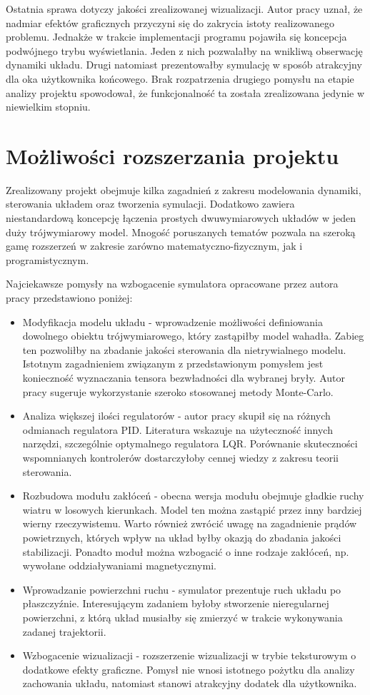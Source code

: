 \documentclass[12pt, twoside, openany]{report}
\theoremstyle{definition}
\begin{document}
Ostatnia sprawa dotyczy jakości zrealizowanej wizualizacji. Autor pracy uznał, że nadmiar efektów graficznych przyczyni się do zakrycia istoty realizowanego problemu. Jednakże w trakcie implementacji programu pojawiła się koncepcja podwójnego trybu wyświetlania. Jeden z nich pozwalałby na wnikliwą obserwację dynamiki układu. Drugi natomiast prezentowałby symulację w sposób atrakcyjny dla oka użytkownika końcowego. Brak rozpatrzenia drugiego pomysłu na etapie analizy projektu spowodował, że funkcjonalność ta została zrealizowana jedynie w niewielkim stopniu.

\section{Możliwości rozszerzania projektu}
Zrealizowany projekt obejmuje kilka zagadnień z zakresu modelowania dynamiki, sterowania układem oraz tworzenia symulacji. Dodatkowo zawiera niestandardową koncepcję łączenia prostych dwuwymiarowych układów w jeden duży trójwymiarowy model. Mnogość poruszanych tematów pozwala na szeroką gamę rozszerzeń w zakresie zarówno matematyczno-fizycznym, jak i programistycznym.

Najciekawsze pomysły na wzbogacenie symulatora opracowane przez autora pracy przedstawiono poniżej:
\begin{itemize}
\item Modyfikacja modelu układu - wprowadzenie możliwości definiowania dowolnego obiektu trójwymiarowego, który zastąpiłby model wahadła. Zabieg ten pozwoliłby na zbadanie jakości sterowania dla nietrywialnego modelu. Istotnym zagadnieniem związanym z przedstawionym pomysłem jest konieczność wyznaczania tensora bezwładności dla wybranej bryły. Autor pracy sugeruje wykorzystanie szeroko stosowanej metody Monte-Carlo.
\item Analiza większej ilości regulatorów - autor pracy skupił się na różnych odmianach regulatora PID. Literatura wskazuje na użyteczność innych narzędzi, szczególnie optymalnego regulatora LQR. Porównanie skuteczności wspomnianych kontrolerów dostarczyłoby cennej wiedzy z zakresu teorii sterowania.
\item Rozbudowa modułu zakłóceń - obecna wersja modułu obejmuje gładkie ruchy wiatru w losowych kierunkach. Model ten można zastąpić przez inny bardziej wierny rzeczywistemu. Warto również zwrócić uwagę na zagadnienie prądów powietrznych, których wpływ na układ byłby okazją do zbadania jakości stabilizacji. Ponadto moduł można wzbogacić o inne rodzaje zakłóceń, np. wywołane oddziaływaniami magnetycznymi.
\item Wprowadzanie powierzchni ruchu - symulator prezentuje ruch układu po płaszczyźnie. Interesującym zadaniem byłoby stworzenie nieregularnej powierzchni, z którą układ musiałby się zmierzyć w trakcie wykonywania zadanej trajektorii.
\item Wzbogacenie wizualizacji - rozszerzenie wizualizacji w trybie teksturowym o dodatkowe efekty graficzne. Pomysł nie wnosi istotnego pożytku dla analizy zachowania układu, natomiast stanowi atrakcyjny dodatek dla użytkownika.
\end{itemize} 
\end{document}

